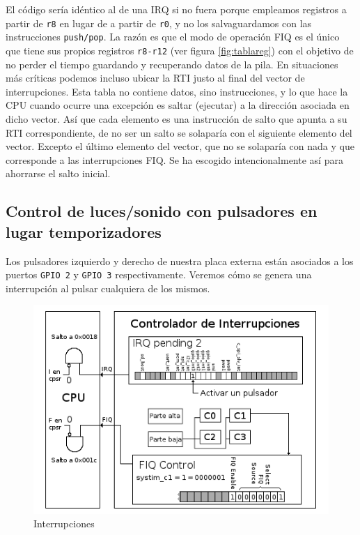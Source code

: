 El código sería idéntico al de una IRQ si no fuera porque empleamos registros a partir de
{\tt r8} en lugar de a partir de {\tt r0}, y no los salvaguardamos con las instrucciones
{\tt push/pop}. La razón es que el modo de operación FIQ es el único que tiene sus propios
registros {\tt r8-r12} (ver figura \ref{fig:tablareg}) con el objetivo de no perder el tiempo
guardando y recuperando datos de la pila. En situaciones más críticas podemos incluso ubicar
la RTI justo al final del vector de interrupciones. Esta tabla no contiene datos, sino instrucciones,
y lo que hace la CPU cuando ocurre una excepción es saltar (ejecutar) a la dirección asociada en
dicho vector. Así que cada elemento es una instrucción de salto que apunta a su RTI
correspondiente, de no ser un salto se solaparía con el siguiente elemento del vector. Excepto
el último elemento del vector, que no se solaparía con nada y que corresponde a las
interrupciones FIQ. Se ha escogido intencionalmente así para ahorrarse el salto inicial.

\subsection{Control de luces/sonido con pulsadores en lugar temporizadores}

Los pulsadores izquierdo y derecho de nuestra placa externa están asociados a los
puertos {\tt GPIO 2} y {\tt GPIO 3} respectivamente. Veremos
cómo se genera una interrupción al pulsar cualquiera de los mismos.

\begin{figure}[h]
  \centering
    \includegraphics[width=14cm]{graphs/inter6.png}
  \caption{Interrupciones}
  \label{fig:inter6}
\end{figure}


